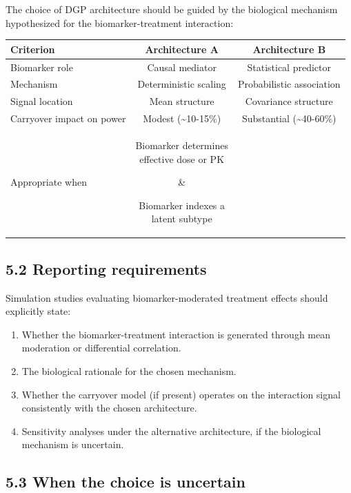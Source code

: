 \documentclass[
]{article}
\begin{document}
The choice of DGP architecture should be guided by the biological
mechanism hypothesized for the biomarker-treatment interaction:

\begin{table}[htbp]
\centering
\begin{tabular}{lcc}
\toprule
Criterion & Architecture A & Architecture B \\
\midrule
Biomarker role & Causal mediator & Statistical predictor \\
Mechanism & Deterministic scaling & Probabilistic association \\
Signal location & Mean structure & Covariance structure \\
Carryover impact on power & Modest (\textasciitilde{}10-15\%) & Substantial (\textasciitilde{}40-60\%) \\
Appropriate when & \parbox[t]{3.5cm}{Biomarker determines\\effective dose or PK} & \parbox[t]{3.5cm}{Biomarker indexes a\\latent subtype} \\
\bottomrule
\end{tabular}
\end{table}

\subsection{5.2 Reporting requirements}

Simulation studies evaluating biomarker-moderated treatment effects
should explicitly state:

\begin{enumerate}
\item Whether the biomarker-treatment interaction is generated through
  mean moderation or differential correlation.
\item The biological rationale for the chosen mechanism.
\item Whether the carryover model (if present) operates on the
  interaction signal consistently with the chosen architecture.
\item Sensitivity analyses under the alternative architecture, if the
  biological mechanism is uncertain.
\end{enumerate}

\subsection{5.3 When the choice is uncertain}
\end{document}
